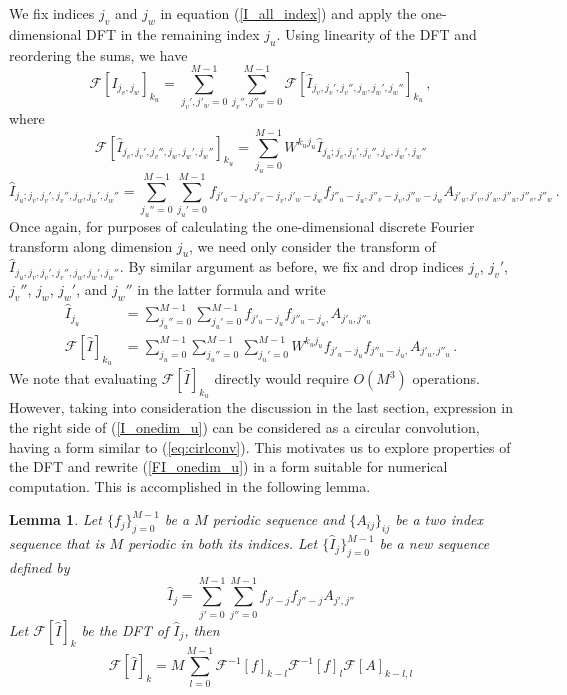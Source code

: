 \documentclass[12pt]{CSUNthesis}
\newtheorem{lemma}{Lemma}
\def\calF{\mathcal{F}}
\begin{document}
We fix indices $j_v$ and $j_w$  in equation (\ref{I_all_index}) and apply the one-dimensional DFT in the remaining index $j_u$. Using linearity of the DFT and reordering the sums, we have 
\begin{equation*}
\calF[I_{j_v,j_w}]_{k_u} = \sum_{j_v',j'_w=0}^{M-1} \sum_{j_v'',j''_{w}=0}^{M-1}  \calF[\hat{I}_{j_v,j_v',j_v'',j_w,j_w',j_w''}]_{k_u}\, ,
\end{equation*}
where 
\begin{equation*}
\calF[\hat{I}_{j_v,j_v',j_v'',j_w,j_w',j_w''}]_{k_u} = 
\sum_{j_u=0}^{M-1}  W^{ k_u j_u} \hat{I}_{j_u;j_v,j_v',j_v'',j_w,j_w',j_w''} 
\end{equation*}
\begin{equation*}
\hat{I}_{j_u;j_v,j_v',j_v'',j_w,j_w',j_w''} = \sum_{j_u''=0}^{M-1} \sum_{j_u'=0}^{M-1} f_{j'_{u}-j_{u},j'_{v}-j_{v},j'_{w}-j_{w}} f_{j''_{u}-j_{u},j''_{v}-j_{v},j''_{w}-j_{w}} A_{j'_{u},j'_{v},j'_{w},j''_u,j''_{v},j''_{w}}\, .
\end{equation*}
Once again, for purposes of calculating the one-dimensional discrete Fourier transform along dimension $j_u$, we need only consider the transform of $\hat{I}_{j_u,j_v,j_v',j_v'',j_w,j_w',j_w''}$. 
By similar argument as before, we fix and drop indices $j_v$, $j_v'$, $j_v''$, $j_w$, $j_w'$, and $j_w''$ in the latter formula and write 
\begin{align}
\label{I_onedim_u}
\hat{I}_{j_u} &= \sum_{j_u''=0}^{M-1} \sum_{j_u'=0}^{M-1} f_{j'_{u}-j_{u}} f_{j''_{u}-j_{u},} A_{j'_{u},j''_u}  \\
\calF[\hat{I}]_{k_u} &= \sum_{j_u=0}^{M-1} \sum_{j_u''=0}^{M-1} \sum_{j_u'=0}^{M-1} W^{k_u j_u} f_{j'_{u}-j_{u}} f_{j''_{u}-j_{u},} A_{j'_{u},j''_u}\, . \label{FI_onedim_u}
\end{align}
We note that evaluating $\calF[\hat{I}]_{k_u}$ directly would require $O(M^3)$ operations.
However, taking into consideration the discussion in the last section, expression in the right side of (\ref{I_onedim_u}) can be considered as a circular convolution, having a form similar to (\ref{eq:cirlconv}). This motivates us to explore properties of the DFT and rewrite (\ref{FI_onedim_u}) in a form suitable for numerical computation. This is accomplished in the following lemma.

\begin{lemma}
\label{lemma_dft}
Let $\{ f_j\}_{j=0}^{M-1}$ be a $M$ periodic sequence and $\{A_{ij}\}_{ij}$ be a two index sequence that is $M$ periodic in both its indices. Let $\{\hat{I}_j\}_{j=0}^{M-1}$ be a new sequence defined by 
\begin{equation}
\label{I_onedim}
\hat{I}_{j} =  \sum_{j'=0}^{M-1} \sum_{j''=0}^{M-1} f_{j'-j}f_{j''-j} A_{j',j''} 
\end{equation}
Let $\calF[\hat{I}]_k$ be the DFT of $\hat{I}_j$, then  
\begin{equation}
\label{onedfconv}
\calF[\hat{I}]_k = M \sum_{l=0}^{M-1} \calF^{-1}[f]_{k-l} \calF^{-1}[f]_{l} \calF[A]_{k-l,l}
\end{equation}
\end{lemma}
\end{document}
